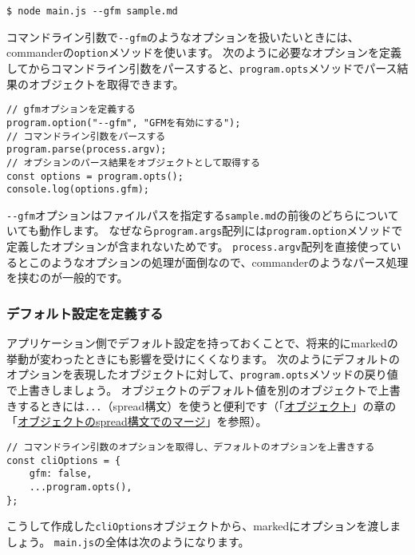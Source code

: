 \begin{lstlisting}
$ node main.js --gfm sample.md
\end{lstlisting}

コマンドライン引数で\texttt{-\/-gfm}のようなオプションを扱いたいときには、commanderの\texttt{option}メソッドを使います。
次のように必要なオプションを定義してからコマンドライン引数をパースすると、\texttt{program.opts}メソッドでパース結果のオブジェクトを取得できます。

\begin{lstlisting}
// gfmオプションを定義する
program.option("--gfm", "GFMを有効にする");
// コマンドライン引数をパースする
program.parse(process.argv);
// オプションのパース結果をオブジェクトとして取得する
const options = program.opts();
console.log(options.gfm);
\end{lstlisting}

\texttt{-\/-gfm}オプションはファイルパスを指定する\texttt{sample.md}の前後のどちらについていても動作します。
なぜなら\texttt{program.args}配列には\texttt{program.option}メソッドで定義したオプションが含まれないためです。
\texttt{process.argv}配列を直接使っているとこのようなオプションの処理が面倒なので、commanderのようなパース処理を挟むのが一般的です。

\hypertarget{declare-default}{%
\subsubsection{デフォルト設定を定義する}\label{declare-default}}

アプリケーション側でデフォルト設定を持っておくことで、将来的にmarkedの挙動が変わったときにも影響を受けにくくなります。
次のようにデフォルトのオプションを表現したオブジェクトに対して、\texttt{program.opts}メソッドの戻り値で上書きしましょう。
オブジェクトのデフォルト値を別のオブジェクトで上書きするときには\texttt{...}（spread構文）を使うと便利です（「\hyperlink{object}{オブジェクト}」の章の「\hyperlink{object-spread-syntax}{オブジェクトのspread構文でのマージ}」を参照）。

\begin{lstlisting}
// コマンドライン引数のオプションを取得し、デフォルトのオプションを上書きする
const cliOptions = {
    gfm: false,
    ...program.opts(),
};
\end{lstlisting}

こうして作成した\texttt{cliOptions}オブジェクトから、markedにオプションを渡しましょう。
\texttt{main.js}の全体は次のようになります。

